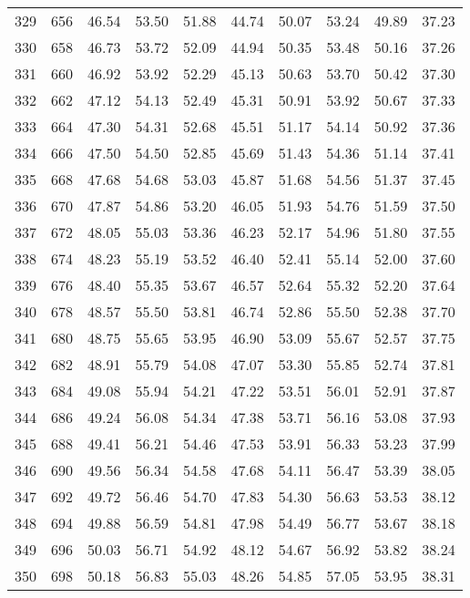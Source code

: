 \begin{longtable}{rrllllllll}
		329 & 656 & 46.54 & 53.50 & 51.88 & 44.74 & 50.07 & 53.24 & 49.89 & 37.23 \\ 
		330 & 658 & 46.73 & 53.72 & 52.09 & 44.94 & 50.35 & 53.48 & 50.16 & 37.26 \\ 
		331 & 660 & 46.92 & 53.92 & 52.29 & 45.13 & 50.63 & 53.70 & 50.42 & 37.30 \\ 
		332 & 662 & 47.12 & 54.13 & 52.49 & 45.31 & 50.91 & 53.92 & 50.67 & 37.33 \\ 
		333 & 664 & 47.30 & 54.31 & 52.68 & 45.51 & 51.17 & 54.14 & 50.92 & 37.36 \\ 
		334 & 666 & 47.50 & 54.50 & 52.85 & 45.69 & 51.43 & 54.36 & 51.14 & 37.41 \\ 
		335 & 668 & 47.68 & 54.68 & 53.03 & 45.87 & 51.68 & 54.56 & 51.37 & 37.45 \\ 
		336 & 670 & 47.87 & 54.86 & 53.20 & 46.05 & 51.93 & 54.76 & 51.59 & 37.50 \\ 
		337 & 672 & 48.05 & 55.03 & 53.36 & 46.23 & 52.17 & 54.96 & 51.80 & 37.55 \\ 
		338 & 674 & 48.23 & 55.19 & 53.52 & 46.40 & 52.41 & 55.14 & 52.00 & 37.60 \\ 
		339 & 676 & 48.40 & 55.35 & 53.67 & 46.57 & 52.64 & 55.32 & 52.20 & 37.64 \\ 
		340 & 678 & 48.57 & 55.50 & 53.81 & 46.74 & 52.86 & 55.50 & 52.38 & 37.70 \\ 
		341 & 680 & 48.75 & 55.65 & 53.95 & 46.90 & 53.09 & 55.67 & 52.57 & 37.75 \\ 
		342 & 682 & 48.91 & 55.79 & 54.08 & 47.07 & 53.30 & 55.85 & 52.74 & 37.81 \\ 
		343 & 684 & 49.08 & 55.94 & 54.21 & 47.22 & 53.51 & 56.01 & 52.91 & 37.87 \\ 
		344 & 686 & 49.24 & 56.08 & 54.34 & 47.38 & 53.71 & 56.16 & 53.08 & 37.93 \\ 
		345 & 688 & 49.41 & 56.21 & 54.46 & 47.53 & 53.91 & 56.33 & 53.23 & 37.99 \\ 
		346 & 690 & 49.56 & 56.34 & 54.58 & 47.68 & 54.11 & 56.47 & 53.39 & 38.05 \\ 
		347 & 692 & 49.72 & 56.46 & 54.70 & 47.83 & 54.30 & 56.63 & 53.53 & 38.12 \\ 
		348 & 694 & 49.88 & 56.59 & 54.81 & 47.98 & 54.49 & 56.77 & 53.67 & 38.18 \\ 
		349 & 696 & 50.03 & 56.71 & 54.92 & 48.12 & 54.67 & 56.92 & 53.82 & 38.24 \\ 
		350 & 698 & 50.18 & 56.83 & 55.03 & 48.26 & 54.85 & 57.05 & 53.95 & 38.31 \\ 

\end{longtable}
